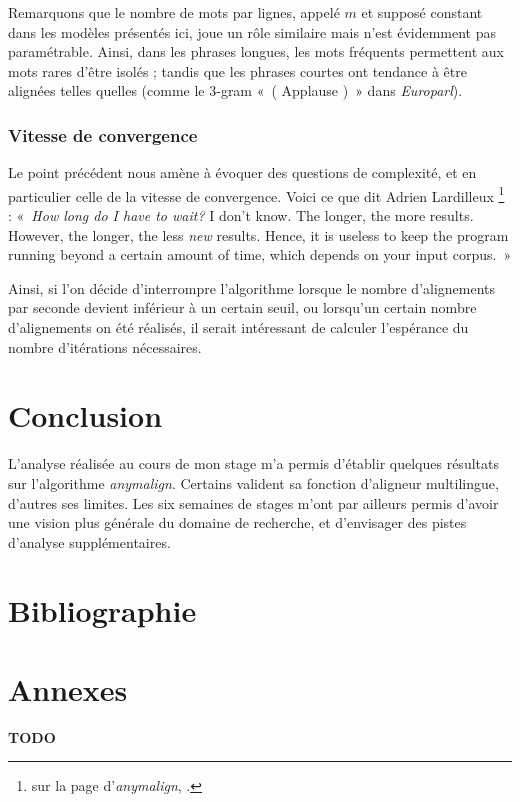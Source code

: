 \documentclass[a4paper,10pt]{article}
\newcommand{\anym}{\emph{anymalign}}
\newcommand{\guill}[1]{«~#1~»}
\begin{document}
Remarquons que le nombre de mots par lignes, appelé $m$ et supposé constant dans les modèles présentés ici, joue un rôle similaire mais n'est évidemment pas paramétrable. Ainsi, dans les phrases longues, les mots fréquents permettent aux mots rares d'être isolés ; tandis que les phrases courtes ont tendance à être alignées telles quelles (comme le 3-gram \guill{( Applause )} dans \emph{Europarl}).

\subsubsection{Vitesse de convergence}

Le point précédent nous amène à évoquer des questions de complexité, et en particulier celle de la vitesse de convergence. Voici ce que dit Adrien Lardilleux \footnote{sur la page d'\anym, \cite{anymalign}.}
: \guill{\emph{How long do I have to wait?} I don't know. The longer, the more results. However, the longer, the less \emph{new} results. Hence, it is useless to keep the program running beyond a certain amount of time, which depends on your input corpus.}

Ainsi, si l'on décide d'interrompre l'algorithme lorsque le nombre d'alignements par seconde devient inférieur à un certain seuil, ou lorsqu'un certain nombre d'alignements on été réalisés, il serait intéressant de calculer l'espérance du nombre d'itérations nécessaires.


\section{Conclusion}

L'analyse réalisée au cours de mon stage m'a permis d'établir quelques résultats sur l'algorithme \anym. Certains valident sa fonction d'aligneur multilingue, d'autres ses limites. Les six semaines de stages m'ont par ailleurs permis d'avoir une vision plus générale du domaine de recherche, et d'envisager des pistes d'analyse supplémentaires.


\section{Bibliographie}




\section{Annexes}

\textbf{TODO}
\end{document}
